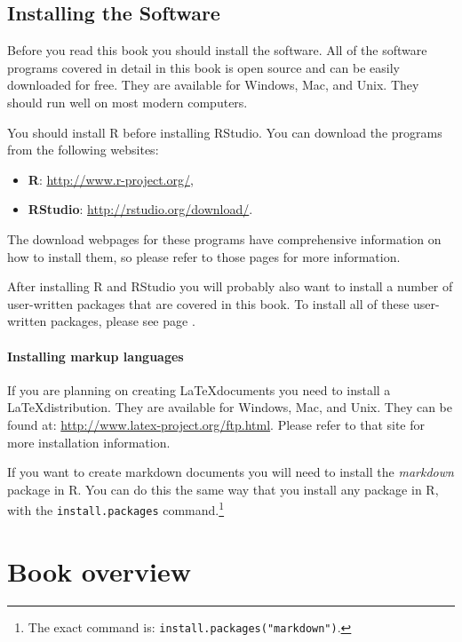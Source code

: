 \subsection{Installing the Software}\label{InstallR}

Before you read this book you should install the software. All of the software programs covered in detail in this book is open source and can be easily downloaded for free. They are available for Windows, Mac, and Unix. They should run well on most modern computers. 

You should install R before installing RStudio. You can download the programs from the following websites:

\begin{itemize}
    \item {\bf{R}}: \url{http://www.r-project.org/},
    \item {\bf{RStudio}}: \url{http://rstudio.org/download/}.
\end{itemize}

\noindent The download webpages for these programs have comprehensive information on how to install them, so please refer to those pages for more information.

After installing R and RStudio you will probably also want to install a number of user-written packages that are covered in this book. To install all of these user-written packages, please see page \pageref{ReqPackages}.

\paragraph{Installing markup languages}

If you are planning on creating \LaTeX documents you need to install a \LaTeX distribution. They are available for Windows, Mac, and Unix. They can be found at: \url{http://www.latex-project.org/ftp.html}. Please refer to that site for more installation information.

If you want to create markdown documents you will need to install the {\emph{markdown}} package in R. You can do this the same way that you install any package in R, with the {\tt{install.packages}} command.\footnote{The exact command is: {\tt{install.packages("markdown")}}.} 


\section{Book overview}

